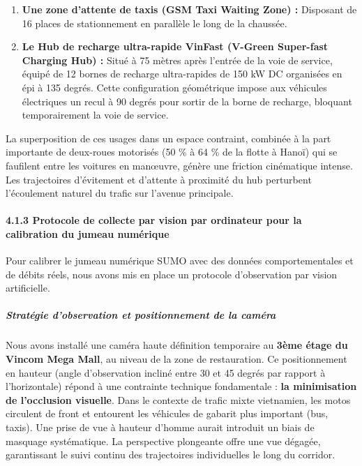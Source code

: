 \documentclass[10pt, a4paper]{article}
\providecommand{\tightlist}{}
\begin{document}
\begin{enumerate}
\def\labelenumi{\arabic{enumi}.}
\tightlist
\item
  \textbf{Une zone d'attente de taxis (GSM Taxi Waiting Zone) :}
  Disposant de 16 places de stationnement en parallèle le long de la
  chaussée.
\item
  \textbf{Le Hub de recharge ultra-rapide VinFast (V-Green Super-fast
  Charging Hub) :} Situé à 75 mètres après l'entrée de la voie de
  service, équipé de 12 bornes de recharge ultra-rapides de 150 kW DC
  organisées en épi à 135 degrés. Cette configuration géométrique impose
  aux véhicules électriques un recul à 90 degrés pour sortir de la borne
  de recharge, bloquant temporairement la voie de service.
\end{enumerate}

La superposition de ces usages dans un espace contraint, combinée à la
part importante de deux-roues motorisés (50 \% à 64 \% de la flotte à
Hanoï) qui se faufilent entre les voitures en manœuvre, génère une
friction cinématique intense. Les trajectoires d'évitement et d'attente
à proximité du hub perturbent l'écoulement naturel du trafic sur
l'avenue principale.

\paragraph{4.1.3 Protocole de collecte par vision par ordinateur pour la
calibration du jumeau
numérique}\label{protocole-de-collecte-par-vision-par-ordinateur-pour-la-calibration-du-jumeau-numuxe9rique}

Pour calibrer le jumeau numérique SUMO avec des données comportementales
et de débits réels, nous avons mis en place un protocole d'observation
par vision artificielle.

\subparagraph{Stratégie d'observation et positionnement de la
caméra}\label{stratuxe9gie-dobservation-et-positionnement-de-la-camuxe9ra}

Nous avons installé une caméra haute définition temporaire au
\textbf{3ème étage du Vincom Mega Mall}, au niveau de la zone de
restauration. Ce positionnement en hauteur (angle d'observation incliné
entre 30 et 45 degrés par rapport à l'horizontale) répond à une
contrainte technique fondamentale : \textbf{la minimisation de
l'occlusion visuelle}. Dans le contexte de trafic mixte vietnamien, les
motos circulent de front et entourent les véhicules de gabarit plus
important (bus, taxis). Une prise de vue à hauteur d'homme aurait
introduit un biais de masquage systématique. La perspective plongeante
offre une vue dégagée, garantissant le suivi continu des trajectoires
individuelles le long du corridor.
\end{document}
